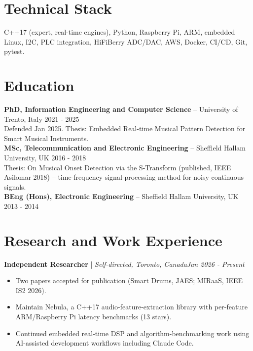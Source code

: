 \documentclass[11pt]{article}
\newenvironment{cvrole}[5]{%
  \par\noindent\textbf{\large #1} | \textit{\small #2, #3}\hfill \textit{\small #4 - #5}\par
  \begin{itemize}[leftmargin=2em, itemsep=-0.3em, topsep=-0.5em]%
}{%
  \end{itemize}\par\noindent\mbox{}\par\vspace{0.1em}%
}
\begin{document}
\section*{Technical Stack}
C++17 (expert, real-time engines), Python, Raspberry Pi, ARM, embedded Linux, I2C, PLC integration, HiFiBerry ADC/DAC, AWS, Docker, CI/CD, Git, pytest.

\section*{Education}
\noindent\textbf{PhD, Information Engineering and Computer Science} -- University of Trento, Italy \hfill 2021 - 2025 \\
Defended Jan 2025. Thesis: Embedded Real-time Musical Pattern Detection for Smart Musical Instruments. \\[4pt]
\noindent\textbf{MSc, Telecommunication and Electronic Engineering} -- Sheffield Hallam University, UK \hfill 2016 - 2018 \\
Thesis: On Musical Onset Detection via the S-Transform (published, IEEE Asilomar 2018) -- time-frequency signal-processing method for noisy continuous signals. \\[4pt]
\noindent\textbf{BEng (Hons), Electronic Engineering} -- Sheffield Hallam University, UK \hfill 2013 - 2014

\section*{Research and Work Experience}

\begin{cvrole}{Independent Researcher}{Self-directed}{Toronto, Canada}{Jan 2026}{Present}
\item Two papers accepted for publication (Smart Drums, JAES; MIRaaS, IEEE IS2 2026).
\item Maintain Nebula, a C++17 audio-feature-extraction library with per-feature ARM/Raspberry Pi latency benchmarks (13 stars).
\item Continued embedded real-time DSP and algorithm-benchmarking work using AI-assisted development workflows including Claude Code.
\end{cvrole}
\end{document}
